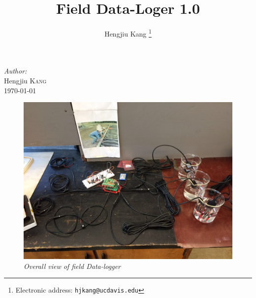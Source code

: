 \begin{titlepage}
\Large \emph{Author:}\\
Hengjiu \textsc{Kang}\\[3cm] %


{\large \today}\\[1.5cm] %




\vfill %

\end{titlepage}

\author{Hengjiu Kang%
  \thanks{Electronic address: \texttt{hjkang@ucdavis.edu}}}


\title{Field Data-Loger 1.0}
\maketitle

\newpage
\begin{figure}[H]
\centering
\includegraphics[width=\textwidth]{overall.jpg}
\caption{\emph{Overall view of field Data-logger}}
\end{figure}

